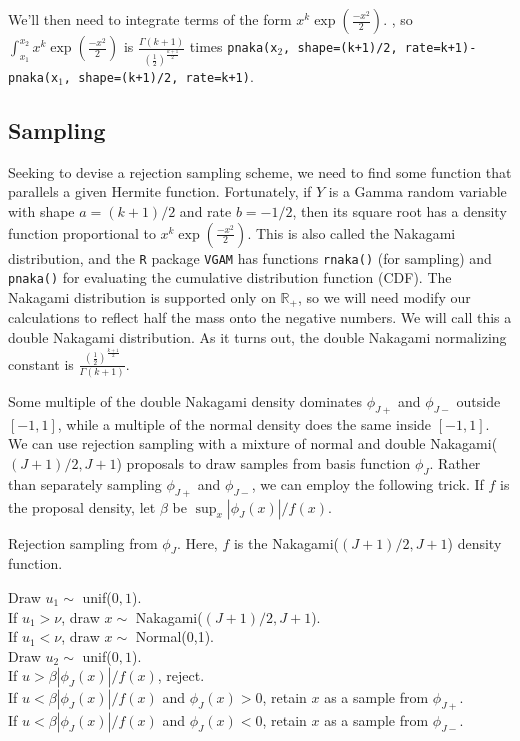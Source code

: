 \documentclass{article}
\begin{document}
We'll then need to integrate terms of the form $x^k\exp(\frac{-x^2}{2})$. , so $\int_{x_1}^{x_2} x^k\exp(\frac{-x^2}{2})$ is $\frac{ \Gamma(k+1)}{(\frac{1}{2})^{\frac{k+1}{2}}}$ times \texttt{pnaka(x$_2$, shape=(k+1)/2, rate=k+1)-pnaka(x$_1$, shape=(k+1)/2, rate=k+1)}. 

\subsection{Sampling}
Seeking to devise a rejection sampling scheme, we need to find some function that parallels a given Hermite function. Fortunately, if $Y$ is a Gamma random variable with shape $a = (k+1)/2$ and rate $b=-1/2$, then its square root has a density function proportional to $x^k\exp(\frac{-x^2}{2})$. This is also called the Nakagami distribution, and the \texttt{R} package \texttt{VGAM} has functions \texttt{rnaka()} (for sampling) and \texttt{pnaka()} for evaluating the cumulative distribution function (CDF). The Nakagami distribution is supported only on $\mathbb{R}_+$, so we will need modify our calculations to reflect half the mass onto the negative numbers. We will call this a double Nakagami distribution. As it turns out, the double Nakagami normalizing constant is $\frac{(\frac{1}{2})^{\frac{k+1}{2}}}{ \Gamma(k+1)}$.

Some multiple of the double Nakagami density dominates $\phi_{J+}$ and $\phi_{J-}$ outside $[-1,1]$, while a multiple of the normal density does the same inside $[-1,1]$. We can use rejection sampling with a mixture of normal and double Nakagami($(J+1)/2, J+1$) proposals to draw samples from basis function $\phi_J$. Rather than separately sampling $\phi_{J+}$ and $\phi_{J-}$, we can employ the following trick. If $f$ is the proposal density, let $\beta$ be $\sup_x |\phi_{J}(x)|/f(x)$. 

\begin{algorithm}[h]
\caption{Rejection sampling from $\phi_{J}$. Here, $f$ is the Nakagami($(J+1)/2, J+1$) density function.} 
Draw $u_1\sim$ unif($0,1$). \\
If $u_1>\nu$, draw $x\sim$ Nakagami($(J+1)/2, J+1$).\\
If $u_1<\nu$, draw $x\sim$ Normal(0,1).\\
Draw $u_2\sim$ unif($0,1$). \\
If $u>\beta|\phi_{J}(x)|/f(x)$, reject.\\
If $u<\beta|\phi_{J}(x)|/f(x)$ and $\phi_{J}(x)>0$, retain $x$ as a sample from $\phi_{J+}$.\\
If $u<\beta|\phi_{J}(x)|/f(x)$ and $\phi_{J}(x)<0$, retain $x$ as a sample from $\phi_{J-}$.\\
\Indp
\Indm
\end{algorithm}
\end{document}
